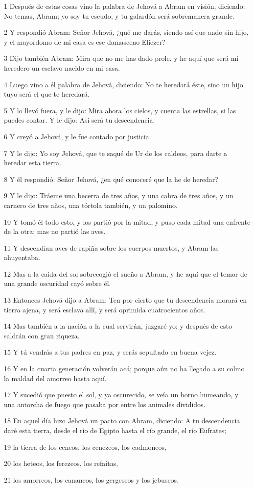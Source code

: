 \par 1 Después de estas cosas vino la palabra de Jehová a Abram en visión, diciendo: No temas, Abram; yo soy tu escudo, y tu galardón será sobremanera grande.
\par 2 Y respondió Abram: Señor Jehová, ¿qué me darás, siendo así que ando sin hijo, y el mayordomo de mi casa es ese damasceno Eliezer?
\par 3 Dijo también Abram: Mira que no me has dado prole, y he aquí que será mi heredero un esclavo nacido en mi casa.
\par 4 Luego vino a él palabra de Jehová, diciendo: No te heredará éste, sino un hijo tuyo será el que te heredará.
\par 5 Y lo llevó fuera, y le dijo: Mira ahora los cielos, y cuenta las estrellas, si las puedes contar. Y le dijo: Así será tu descendencia.
\par 6 Y creyó a Jehová, y le fue contado por justicia.
\par 7 Y le dijo: Yo soy Jehová, que te saqué de Ur de los caldeos, para darte a heredar esta tierra.
\par 8 Y él respondió: Señor Jehová, ¿en qué conoceré que la he de heredar?
\par 9 Y le dijo: Tráeme una becerra de tres años, y una cabra de tres años, y un carnero de tres años, una tórtola también, y un palomino.
\par 10 Y tomó él todo esto, y los partió por la mitad, y puso cada mitad una enfrente de la otra; mas no partió las aves.
\par 11 Y descendían aves de rapiña sobre los cuerpos muertos, y Abram las ahuyentaba.
\par 12 Mas a la caída del sol sobrecogió el sueño a Abram, y he aquí que el temor de una grande oscuridad cayó sobre él.
\par 13 Entonces Jehová dijo a Abram: Ten por cierto que tu descendencia morará en tierra ajena, y será esclava allí, y será oprimida cuatrocientos años.
\par 14 Mas también a la nación a la cual servirán, juzgaré yo; y después de esto saldrán con gran riqueza.
\par 15 Y tú vendrás a tus padres en paz, y serás sepultado en buena vejez.
\par 16 Y en la cuarta generación volverán acá; porque aún no ha llegado a su colmo la maldad del amorreo hasta aquí.
\par 17 Y sucedió que puesto el sol, y ya oscurecido, se veía un horno humeando, y una antorcha de fuego que pasaba por entre los animales divididos.
\par 18 En aquel día hizo Jehová un pacto con Abram, diciendo: A tu descendencia daré esta tierra, desde el río de Egipto hasta el río grande, el río Eufrates;
\par 19 la tierra de los ceneos, los cenezeos, los cadmoneos,
\par 20 los heteos, los ferezeos, los refaítas,
\par 21 los amorreos, los cananeos, los gergeseos y los jebuseos.

